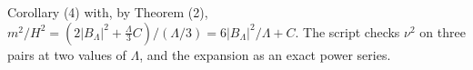 Corollary (4) with, by Theorem (2), $m^{2}/H^{2} = (2|B_{\Lambda}|^{2} + \tfrac{\Lambda}{3}C)/(\Lambda/3) = 6|B_{\Lambda}|^{2}/\Lambda + C$. The script checks $\nu^{2}$ on three pairs at two values of $\Lambda$, and the expansion as an exact power series.
